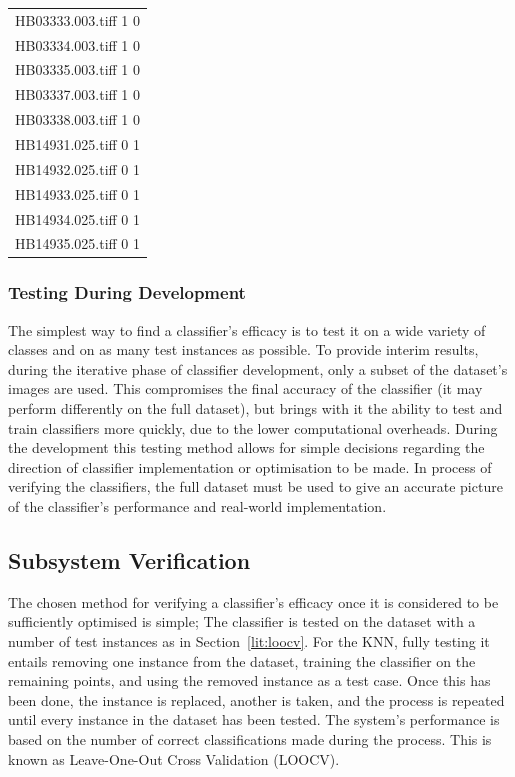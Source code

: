 \begin{center}
\begin{tabular}{c}
HB03333.003.tiff 1 0 \\
HB03334.003.tiff 1 0 \\
HB03335.003.tiff 1 0 \\
HB03337.003.tiff 1 0 \\
HB03338.003.tiff 1 0 \\
HB14931.025.tiff 0 1 \\
HB14932.025.tiff 0 1 \\
HB14933.025.tiff 0 1 \\
HB14934.025.tiff 0 1 \\
HB14935.025.tiff 0 1 \\


\end{tabular}
\end{center}

\subsubsection{Testing During Development}
The simplest way to find a classifier's efficacy is to test it on a wide variety of classes and on as many test instances as possible. To provide interim results, during the iterative phase of classifier development, only a subset of the dataset's images are used. This compromises the final accuracy of the classifier (it may perform differently on the full dataset), but brings with it the ability to test and train classifiers more quickly, due to the lower computational overheads. During the development this testing method allows for simple decisions regarding the direction of classifier implementation or optimisation to be made. In process of verifying the classifiers, the full dataset must be used to give an accurate picture of the classifier's performance and real-world implementation. 

\subsection{Subsystem Verification}
The chosen method for verifying a classifier's efficacy once it is considered to be sufficiently optimised is simple; The classifier is tested on the dataset with a number of test instances as in Section~\ref{lit:loocv}. For the KNN, fully testing it entails removing one instance from the dataset, training the classifier on the remaining points, and using the removed instance as a test case. Once this has been done, the instance is replaced, another is taken, and the process is repeated until every instance in the dataset has been tested. The system's performance is based on the number of correct classifications made during the process. This is known as Leave-One-Out Cross Validation (LOOCV).


